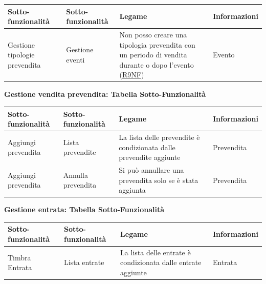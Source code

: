 \documentclass[a4paper]{article}
\begin{document}
\begin{center}
    \begin{tabularx}{1\textwidth}{|X|X|X|X|}
    \hline
    \textbf{Sotto-funzionalità} & \textbf{Sotto-funzionalità} & \textbf{Legame} & \textbf{Informazioni}\\
    \hline
    \hline
    Gestione tipologie prevendita & Gestione eventi & Non posso creare una tipologia prevendita con un periodo di vendita durante o dopo l'evento (\hyperlink{R9NF}{R9NF}) & Evento\\
    \hline
    \end{tabularx}
\end{center}

\newpage

\textbf{Gestione vendita prevendita: Tabella Sotto-Funzionalità}

\begin{center}
    \begin{tabularx}{1\textwidth}{|X|X|X|X|}
    \hline
    \textbf{Sotto-funzionalità} & \textbf{Sotto-funzionalità} & \textbf{Legame} & \textbf{Informazioni}\\
    \hline
    \hline
    Aggiungi prevendita & Lista prevendite & La lista delle prevendite è condizionata dalle prevendite aggiunte & Prevendita\\
    \hline
    Aggiungi prevendita & Annulla prevendita & Si può annullare una prevendita solo se è stata aggiunta & Prevendita\\
    \hline
    \end{tabularx}
\end{center}

\textbf{Gestione entrata: Tabella Sotto-Funzionalità}

\begin{center}
    \begin{tabularx}{1\textwidth}{|X|X|X|X|}
    \hline
    \textbf{Sotto-funzionalità} & \textbf{Sotto-funzionalità} & \textbf{Legame} & \textbf{Informazioni}\\
    \hline
    \hline
    Timbra Entrata & Lista entrate & La lista delle entrate è condizionata dalle entrate aggiunte & Entrata\\
    \hline
    \end{tabularx}
\end{center}
\end{document}
